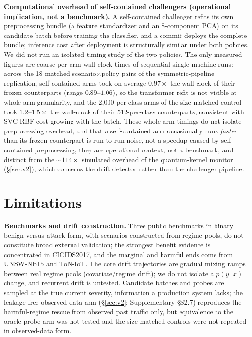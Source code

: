 \documentclass[journal]{IEEEtran}
\begin{document}
\textbf{Computational overhead of self-contained challengers (operational implication, not a benchmark).} A self-contained challenger refits its own preprocessing bundle (a feature standardizer and an 8-component PCA) on its candidate batch before training the classifier, and a commit deploys the complete bundle; inference cost after deployment is structurally similar under both policies. We did not run an isolated timing study of the two policies. The only measured figures are coarse per-arm wall-clock times of sequential single-machine runs: across the 18 matched scenario$\times$policy pairs of the symmetric-pipeline replication, self-contained arms took on average $0.97\times$ the wall-clock of their frozen counterparts (range $0.89$--$1.06$), so the transformer refit is not visible at whole-arm granularity, and the 2{,}000-per-class arms of the size-matched control took $1.2$--$1.5\times$ the wall-clock of their 512-per-class counterparts, consistent with SVC-RBF cost growing with the batch. These whole-arm timings do not isolate preprocessing overhead, and that a self-contained arm occasionally runs \emph{faster} than its frozen counterpart is run-to-run noise, not a speedup caused by self-contained preprocessing; they are operational context, not a benchmark, and distinct from the ${\sim}114\times$ simulated overhead of the quantum-kernel monitor (\S\ref{sec:v2}), which concerns the drift detector rather than the challenger pipeline.


\section{Limitations}


\textbf{Benchmarks and drift construction.} Three public benchmarks in binary benign-versus-attack form, with scenarios constructed from regime pools, do not constitute broad external validation; the strongest benefit evidence is concentrated in CICIDS2017, and the marginal and harmful ends come from UNSW-NB15 and ToN-IoT. The core drift trajectories are gradual mixing ramps between real regime pools (covariate/regime drift); we do not isolate a $p(y\,|\,x)$ change, and recurrent drift is untested. Candidate batches and probes are sampled at the true current severity, information a production system lacks; the leakage-free observed-data arm (\S\ref{sec:v2}; Supplementary \S S2.7) reproduces the harmful-regime rescue from observed past traffic only, but equivalence to the oracle-probe arm was not tested and the size-matched controls were not repeated in observed-data form.
\end{document}

